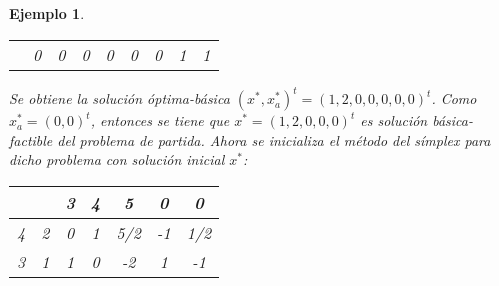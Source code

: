 \documentclass[11pt]{report}
\theoremstyle{mytheorem}
\theoremstyle{mydefinition}
\theoremstyle{myexample}
\newtheorem*{example}{Ejemplo}
\begin{document}
\begin{example}
\begin{center}
\begin{tabular}{|c|c|c|c|c|c|c|c|c|}
    \multicolumn{1}{c|}{} & 0 & \multicolumn{1}{c}{\phantom{-}0} & \multicolumn{1}{c}{\phantom{-}0} & \multicolumn{1}{c}{\phantom{-}0} & \multicolumn{1}{c}{\phantom{-}0} & \multicolumn{1}{c}{\phantom{-}0} & \multicolumn{1}{c}{\phantom{-}1} & \multicolumn{1}{c|}{\phantom{-}1} \\ \cline{2-9}
\end{tabular}
\end{center}
Se obtiene la solución óptima-básica $(x^*,x_a^*)^t = (1,2,0,0,0,0,0)^t$. Como $x_a^* = (0,0)^t$, entonces se tiene que $x^* = (1,2,0,0,0)^t$ es solución básica-factible del problema de partida. Ahora se inicializa el método del símplex para dicho problema con solución inicial $x^*$:
\begin{center}
\begin{tabular}{|c|c|c|c|c|c|c|}
    \cline{3-7}
    
    \multicolumn{1}{c}{} & \multicolumn{1}{c|}{} & \multicolumn{1}{c}{3} & \multicolumn{1}{c}{4} & \multicolumn{1}{c}{\phantom{-}5} & \multicolumn{1}{c}{\phantom{-}0} & \multicolumn{1}{c|}{\phantom{-}0} \\ \hline
    
    4 & 2 & \multicolumn{1}{c}{0} & \multicolumn{1}{c}{1} & \multicolumn{1}{c}{\phantom{-}5/2} & \multicolumn{1}{c}{-1} & \multicolumn{1}{c|}{\phantom{-}1/2} \\
    
    3 & 1 & \multicolumn{1}{c}{1} & \multicolumn{1}{c}{0} & \multicolumn{1}{c}{-2} & \multicolumn{1}{c}{\phantom{-}1} & \multicolumn{1}{c|}{-1} \\ \hline
    

\end{tabular}
\end{center}
\end{example}
\end{document}
